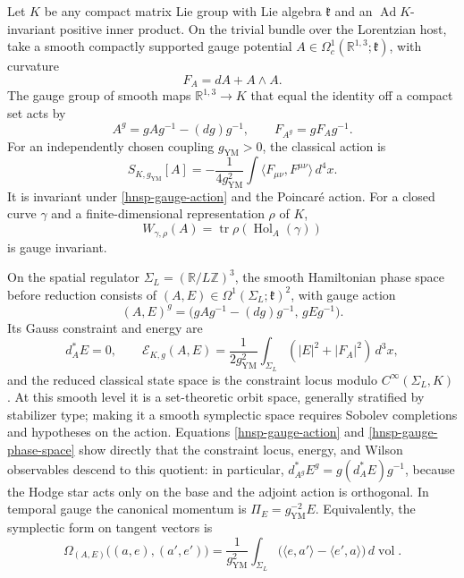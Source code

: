 Let \(K\) be any compact matrix Lie group with Lie algebra \(\mathfrak k\)
and an \(\operatorname{Ad}K\)-invariant positive inner product.  On the
trivial bundle over the Lorentzian host, take a smooth compactly supported
gauge potential \(A\in\Omega_c^1(\mathbb R^{1,3};\mathfrak k)\), with
curvature
\begin{equation}
 F_A=dA+A\wedge A.
 \label{hnsp-gauge-curvature}
\end{equation}
The gauge group of smooth maps \(\mathbb R^{1,3}\to K\) that equal the
identity off a compact set acts by
\begin{equation}
 A^g=gAg^{-1}-(dg)g^{-1},\qquad F_{A^g}=gF_A g^{-1}.
 \label{hnsp-gauge-action}
\end{equation}
For an independently chosen coupling \(g_{\mathrm{YM}}>0\), the classical
action is
\begin{equation}
 S_{K,g_{\mathrm{YM}}}[A]
 =-\frac1{4g_{\mathrm{YM}}^2}
 \int\langle F_{\mu\nu},F^{\mu\nu}\rangle\,d^4x.
 \label{hnsp-yang-mills-action}
\end{equation}
It is invariant under \eqref{hnsp-gauge-action} and the Poincar\'e action.
For a closed curve \(\gamma\) and a finite-dimensional representation
\(\rho\) of \(K\),
\begin{equation}
 W_{\gamma,\rho}(A)
 =\operatorname{tr}\rho(\operatorname{Hol}_A(\gamma))
 \label{hnsp-wilson-observable}
\end{equation}
is gauge invariant.

On the spatial regulator \(\Sigma_L=(\mathbb R/L\mathbb Z)^3\), the smooth
Hamiltonian phase space before reduction consists of
\((A,E)\in\Omega^1(\Sigma_L;\mathfrak k)^2\), with gauge action
\begin{equation}
 (A,E)^g=\bigl(gAg^{-1}-(dg)g^{-1},\,gEg^{-1}\bigr).
 \label{hnsp-hamiltonian-gauge-action}
\end{equation}
Its Gauss constraint and
energy are
\begin{equation}
 d_A^*E=0,\qquad
 \mathcal E_{K,g}(A,E)=\frac1{2g_{\mathrm{YM}}^2}
 \int_{\Sigma_L}(|E|^2+|F_A|^2)\,d^3x,
 \label{hnsp-gauge-phase-space}
\end{equation}
and the reduced classical state space is the constraint locus modulo
\(C^\infty(\Sigma_L,K)\).  At this smooth level it is a set-theoretic orbit
space, generally stratified by stabilizer type; making it a smooth symplectic
space requires Sobolev completions and hypotheses on the action.  Equations
\eqref{hnsp-gauge-action} and \eqref{hnsp-gauge-phase-space} show directly
that the constraint locus, energy, and Wilson observables descend to this
quotient: in particular,
\(d_{A^g}^*E^g=g(d_A^*E)g^{-1}\), because the Hodge star acts only on the
base and the adjoint action is orthogonal.  In temporal gauge the canonical momentum is
\(\Pi_E=g_{\mathrm{YM}}^{-2}E\).  Equivalently, the symplectic form on
tangent vectors is
\begin{equation}
 \Omega_{(A,E)}\bigl((a,e),(a',e')\bigr)
 =\frac1{g_{\mathrm{YM}}^2}\int_{\Sigma_L}
 \bigl(\langle e,a'\rangle-\langle e',a\rangle\bigr)\,d\operatorname{vol}.
 \label{hnsp-gauge-symplectic-form}
\end{equation}

